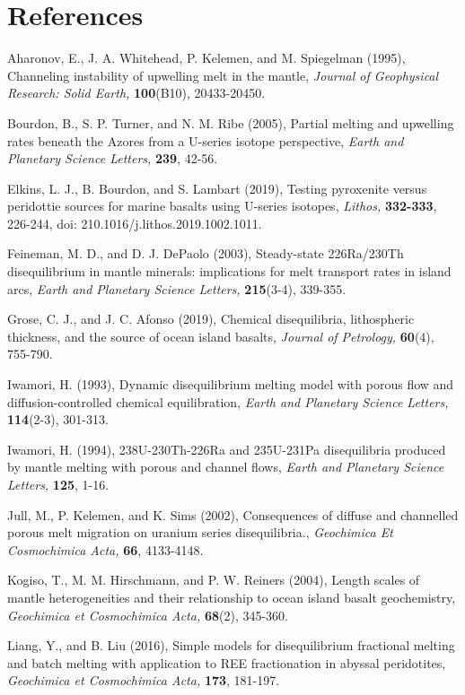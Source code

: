 \documentclass[11pt]{article}
\begin{document}
    \hypertarget{references}{%
\section*{References}\label{references}}

    Aharonov, E., J. A. Whitehead, P. Kelemen, and M. Spiegelman (1995),
Channeling instability of upwelling melt in the mantle, \emph{Journal of
Geophysical Research: Solid Earth,} \textbf{100}(B10), 20433-20450.

Bourdon, B., S. P. Turner, and N. M. Ribe (2005), Partial melting and
upwelling rates beneath the Azores from a U-series isotope perspective,
\emph{Earth and Planetary Science Letters,} \textbf{239}, 42-56.

Elkins, L. J., B. Bourdon, and S. Lambart (2019), Testing pyroxenite
versus peridottie sources for marine basalts using U-series isotopes,
\emph{Lithos,} \textbf{332-333}, 226-244, doi:
210.1016/j.lithos.2019.1002.1011.

Feineman, M. D., and D. J. DePaolo (2003), Steady-state 226Ra/230Th
disequilibrium in mantle minerals: implications for melt transport rates
in island arcs, \emph{Earth and Planetary Science Letters,}
\textbf{215}(3-4), 339-355.

Grose, C. J., and J. C. Afonso (2019), Chemical disequilibria,
lithospheric thickness, and the source of ocean island basalts,
\emph{Journal of Petrology,} \textbf{60}(4), 755-790.

Iwamori, H. (1993), Dynamic disequilibrium melting model with porous
flow and diffusion-controlled chemical equilibration, \emph{Earth and
Planetary Science Letters,} \textbf{114}(2-3), 301-313.

Iwamori, H. (1994), 238U-230Th-226Ra and 235U-231Pa disequilibria
produced by mantle melting with porous and channel flows, \emph{Earth
and Planetary Science Letters,} \textbf{125}, 1-16.

Jull, M., P. Kelemen, and K. Sims (2002), Consequences of diffuse and
channelled porous melt migration on uranium series disequilibria.,
\emph{Geochimica Et Cosmochimica Acta,} \textbf{66}, 4133-4148.

Kogiso, T., M. M. Hirschmann, and P. W. Reiners (2004), Length scales of
mantle heterogeneities and their relationship to ocean island basalt
geochemistry, \emph{Geochimica et Cosmochimica Acta,} \textbf{68}(2),
345-360.

Liang, Y., and B. Liu (2016), Simple models for disequilibrium
fractional melting and batch melting with application to REE
fractionation in abyssal peridotites, \emph{Geochimica et Cosmochimica
Acta,} \textbf{173}, 181-197.
\end{document}
